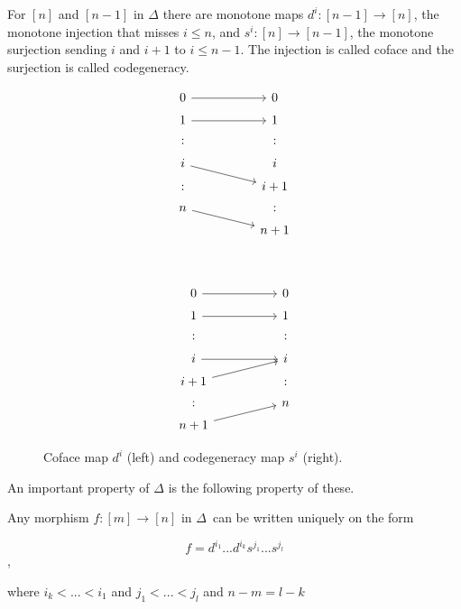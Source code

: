 \documentclass[../../main.tex]{subfiles}
\begin{document}
    For $[n]$ and $[n-1]$ in $\Delta$ there are monotone maps $d^i: [n-1] \to [n]$, the monotone injection that misses $i \leq n$, and $s^i: [n] \to [n-1]$, the monotone surjection sending $i$ and $i+1$ to $i \leq n-1$. The injection is called coface and the surjection is called codegeneracy. 

    \begin{figure}[H]
        \begin{subfigure}[b]{0.45\textwidth}
            \[
                \begin{tikzcd}[row sep = 1ex, column sep = 5em]
                    0  \arrow[r] &  0 \\
                    1  \arrow[r] &  1 \\
                    : & : \\
                    i \arrow[dr] & i\\
                    : & i+1\\
                    n \arrow[dr] & :\\
                    & n+1
                \end{tikzcd}
          \]
        \end{subfigure}
        ~
        \begin{subfigure}[b]{0.45\textwidth}
            \[
                \begin{tikzcd}[row sep = 1ex, column sep = 5em]
                    0  \arrow[r] &  0 \\
                    1  \arrow[r] &  1 \\
                    : & : \\
                    i \arrow[r] &  i\\
                    i + 1 \arrow[ur] & :\\
                    : & n\\
                    n + 1 \arrow[ur] 
                \end{tikzcd}
          \]
        \end{subfigure}
        \caption{Coface map $d^i$ (left) and codegeneracy map $s^i$ (right).}
    \end{figure}
    
    An important property of $\Delta$ is the following property of these.

    \begin{proposition}\label{uni-fun}
        Any morphism $f: [m] \to [n]$ in $\Delta$ can be written uniquely on the form

        \begin{equation*}
            f = d^{i_1}...d^{i_k}s^{j_1}...s^{j_l}
        \end{equation*},

        where $i_k < ... < i_1$ and $j_1 < ... < j_l$ and $n - m = l - k$
    \end{proposition}
\end{document}

